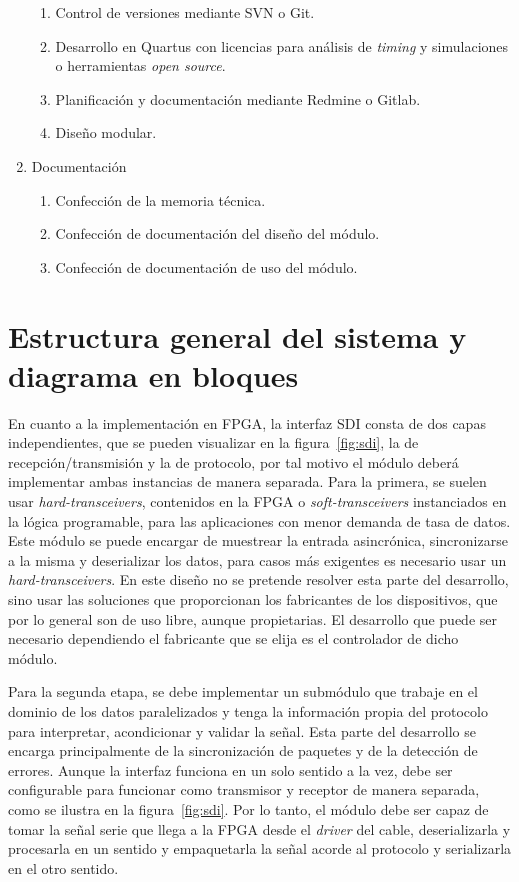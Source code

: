 \begin{enumerate}
\begin{enumerate}
        \item Control de versiones mediante SVN o Git.
        \item Desarrollo en Quartus con licencias para análisis de \textit{timing} y simulaciones o herramientas \textit{open source}.
        \item Planificación y documentación mediante Redmine o Gitlab.
        \item Diseño modular.
    \end{enumerate}
    \item Documentación
    \begin{enumerate}
        \item Confección de la memoria técnica.
        \item Confección de documentación del diseño del módulo.
        \item Confección de documentación de uso del módulo.
    \end{enumerate}
\end{enumerate}

\section{Estructura general del sistema y diagrama en bloques}

En cuanto a la implementación en FPGA, la interfaz SDI consta de dos capas
independientes, que se pueden visualizar en la figura~\ref{fig:sdi}, la de
recepción/transmisión y la de protocolo, por tal motivo el módulo deberá
implementar ambas instancias de manera separada. Para la primera, se suelen
usar \textit{hard-transceivers}, contenidos en la FPGA o \textit{soft-transceivers}
instanciados en la lógica programable, para las aplicaciones con menor demanda
de tasa de datos. Este módulo se puede encargar de muestrear la entrada
asincrónica, sincronizarse a la misma y deserializar los datos, para casos más
exigentes es necesario usar un \textit{hard-transceivers}. En este diseño no se
pretende resolver esta parte del desarrollo, sino usar las soluciones que
proporcionan los fabricantes de los dispositivos, que por lo general son de uso
libre, aunque propietarias. El desarrollo que puede ser necesario dependiendo
el fabricante que se elija es el controlador de dicho módulo.

Para la segunda etapa, se debe implementar un submódulo que trabaje en el dominio
de los datos paralelizados y tenga la información propia del protocolo para
interpretar, acondicionar y validar la señal. Esta parte del desarrollo se
encarga principalmente de la sincronización de paquetes y de la detección de
errores. Aunque la interfaz funciona en un solo sentido a la vez, debe ser
configurable para funcionar como transmisor y receptor de manera separada, como
se ilustra en la figura~\ref{fig:sdi}. Por lo tanto, el módulo debe ser capaz
de tomar la señal serie que llega a la FPGA desde el \textit{driver} del cable,
deserializarla y procesarla en un sentido y empaquetarla la señal acorde al
protocolo y serializarla en el otro sentido.

